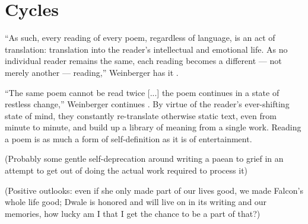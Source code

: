 \documentclass[12pt,oneside]{memoir}
\begin{document}
\section*{Cycles}

``As such, every reading of every poem, regardless of language, is an act of translation: translation into the reader's intellectual and emotional life. As no individual reader remains the same, each reading becomes a different --- not merely another --- reading,'' Weinberger has it \parencite[46]{wangwei}.

``The same poem cannot be read twice [...] the poem continues in a state of restless change,'' Weinberger continues \parencite[46]{wangwei}. By virtue of the reader's ever-shifting state of mind, they constantly re-translate otherwise static text, even from minute to minute, and build up a library of meaning from a single work. Reading a poem is as much a form of self-definition as it is of entertainment.

(Probably some gentle self-deprecation around writing a paean to grief in an attempt to get out of doing the actual work required to process it)

(Positive outlooks: even if she only made part of our lives good, we made Falcon's whole life good; Dwale is honored and will live on in its writing and our memories, how lucky am I that I get the chance to be a part of that?)


\printbibliography
\end{document}
